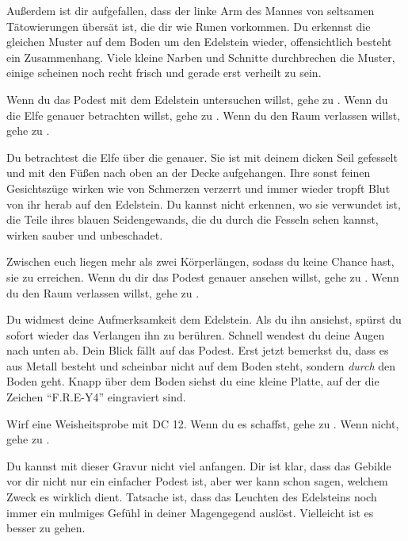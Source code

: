 Außerdem ist dir aufgefallen, dass der linke Arm des Mannes von seltsamen Tätowierungen übersät ist, die dir wie Runen vorkommen. Du erkennst die gleichen Muster auf dem Boden um den Edelstein wieder, offensichtlich besteht ein Zusammenhang. Viele kleine Narben und Schnitte durchbrechen die Muster, einige scheinen noch recht frisch und gerade erst verheilt zu sein.

Wenn du das Podest mit dem Edelstein untersuchen willst, gehe zu .
Wenn du die Elfe genauer betrachten willst, gehe zu .
Wenn du den Raum verlassen willst, gehe zu .


Du betrachtest die Elfe über die genauer. Sie ist mit deinem dicken Seil gefesselt und mit den Füßen nach oben an der Decke aufgehangen. Ihre sonst feinen Gesichtszüge wirken wie von Schmerzen verzerrt und immer wieder tropft Blut von ihr herab auf den Edelstein.
Du kannst nicht erkennen, wo sie verwundet ist, die Teile ihres blauen Seidengewands, die du durch die Fesseln sehen kannst, wirken sauber und unbeschadet.

Zwischen euch liegen mehr als zwei Körperlängen, sodass du keine Chance hast, sie zu erreichen. Wenn du dir das Podest genauer ansehen willst, gehe zu .
Wenn du den Raum verlassen willst, gehe zu .


Du widmest deine Aufmerksamkeit dem Edelstein. Als du ihn ansiehst, spürst du sofort wieder das Verlangen ihn zu berühren. Schnell wendest du deine Augen nach unten ab. Dein Blick fällt auf das Podest. Erst jetzt bemerkst du, dass es aus Metall besteht und scheinbar nicht auf dem Boden steht, sondern \textit{durch} den Boden geht. Knapp über dem Boden siehst du eine kleine Platte, auf der die Zeichen ``F.R.E-Y4'' eingraviert sind.

Wirf eine Weisheitsprobe mit DC 12. Wenn du es schaffst, gehe zu .
Wenn nicht, gehe zu .


Du kannst mit dieser Gravur nicht viel anfangen. Dir ist klar, dass das Gebilde vor dir nicht nur ein einfacher Podest ist, aber wer kann schon sagen, welchem Zweck es wirklich dient. Tatsache ist, dass das Leuchten des Edelsteins noch immer ein mulmiges Gefühl in deiner Magengegend auslöst. Vielleicht ist es besser zu gehen.

